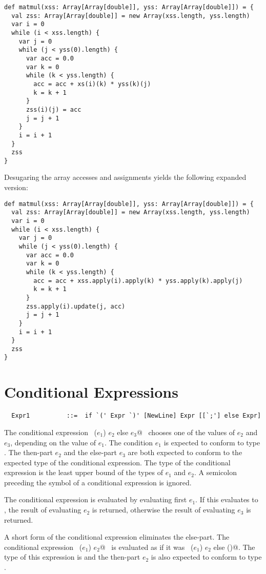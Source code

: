 \begin{lstlisting}
def matmul(xss: Array[Array[double]], yss: Array[Array[double]]) = {
  val zss: Array[Array[double]] = new Array(xss.length, yss.length) 
  var i = 0 
  while (i < xss.length) {
    var j = 0 
    while (j < yss(0).length) {
      var acc = 0.0 
      var k = 0 
      while (k < yss.length) {
        acc = acc + xs(i)(k) * yss(k)(j) 
        k = k + 1
      }
      zss(i)(j) = acc 
      j = j + 1
    }
    i = i + 1
  }
  zss
}
\end{lstlisting}
Desugaring the array accesses and assignments yields the following
expanded version:
\begin{lstlisting}
def matmul(xss: Array[Array[double]], yss: Array[Array[double]]) = {
  val zss: Array[Array[double]] = new Array(xss.length, yss.length) 
  var i = 0 
  while (i < xss.length) {
    var j = 0 
    while (j < yss(0).length) {
      var acc = 0.0 
      var k = 0 
      while (k < yss.length) {
        acc = acc + xss.apply(i).apply(k) * yss.apply(k).apply(j) 
        k = k + 1
      }
      zss.apply(i).update(j, acc) 
      j = j + 1
    }
    i = i + 1
  }
  zss
}
\end{lstlisting}

\section{Conditional Expressions}

\syntax\begin{lstlisting}
  Expr1          ::=  if `(' Expr `)' [NewLine] Expr [[`;'] else Expr]
\end{lstlisting}

The conditional expression ~\lstinline@if ($e_1$) $e_2$ else $e_3$@~ chooses
one of the values of $e_2$ and $e_3$, depending on the
value of $e_1$. The condition $e_1$ is expected to
conform to type .  The then-part $e_2$ and the
else-part $e_3$ are both expected to conform to the expected
type of the conditional expression. The type of the conditional
expression is the least upper bound of the types of $e_1$ and
$e_2$.  A semicolon preceding the  symbol of a
conditional expression is ignored.

The conditional expression is evaluated by evaluating first
$e_1$. If this evaluates to , the result of
evaluating $e_2$ is returned, otherwise the result of
evaluating $e_3$ is returned.

A short form of the conditional expression eliminates the
else-part. The conditional expression ~\lstinline@if ($e_1$) $e_2$@~ is
evaluated as if it was ~\lstinline@if ($e_1$) $e_2$ else ()@.  The type of
this expression is  and the then-part
$e_2$ is also expected to conform to type .

